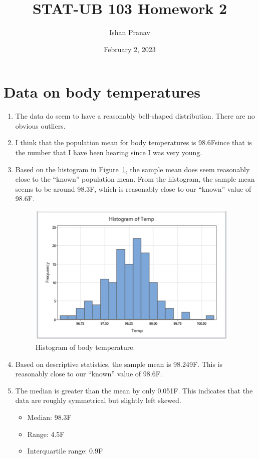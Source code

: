 \documentclass[12pt]{article}
\title{STAT-UB 103 Homework 2}
\author{Ishan Pranav}
\date{February 2, 2023}
\newcommand{\degreef}{\degree F}
\begin{document}
\maketitle
\section{Data on body temperatures}
\begin{enumerate}
\item The data do seem to have a reasonably bell-shaped distribution. There are no obvious outliers. 
\item I think that the population mean for body temperatures is 98.6\degreef since that is the number that I have been hearing since I was very young. 
\item
Based on the histogram in Figure~\ref{fig:temperaturehistogram}, the sample mean does seem reasonably close to the “known” population mean. From the histogram, the sample mean seems to be around 98.3\degreef, which is reasonably close to our “known” value of 98.6\degreef. 
\begin{figure}
\begin{center}
\includegraphics[width=4in]{images/temperature-histogram.png}
\end{center}
\caption{Histogram of body temperature.\label{fig:temperaturehistogram}}
\end{figure}

\item Based on descriptive statistics, the sample mean is 98.249\degreef. This is reasonably close to our “known” value of 98.6\degreef. 
\item
The median is greater than the mean by only 0.051\degreef. This indicates that the data are roughly symmetrical but slightly left skewed.
\begin{itemize}
    \item Median: 98.3\degreef
    \item Range: 4.5\degreef
    \item Interquartile range: 0.9\degreef
\end{itemize}
\end{enumerate}
\end{document}
